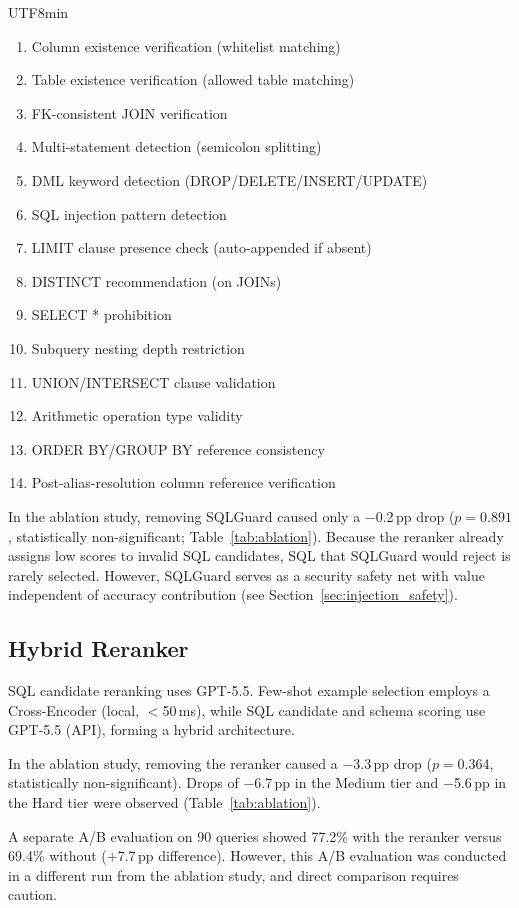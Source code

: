 \documentclass[sn-mathphys,Numbered]{sn-jnl}
\begin{document}
\begin{CJK}{UTF8}{min}
\begin{enumerate}[nosep]
  \item Column existence verification (whitelist matching)
  \item Table existence verification (allowed table matching)
  \item FK-consistent JOIN verification
  \item Multi-statement detection (semicolon splitting)
  \item DML keyword detection (DROP/DELETE/INSERT/UPDATE)
  \item SQL injection pattern detection
  \item LIMIT clause presence check (auto-appended if absent)
  \item DISTINCT recommendation (on JOINs)
  \item SELECT * prohibition
  \item Subquery nesting depth restriction
  \item UNION/INTERSECT clause validation
  \item Arithmetic operation type validity
  \item ORDER BY/GROUP BY reference consistency
  \item Post-alias-resolution column reference verification
\end{enumerate}

In the ablation study, removing SQLGuard caused only a $-$0.2\,pp
drop ($p=0.891$, statistically non-significant;
Table~\ref{tab:ablation}).
Because the reranker already assigns low scores to invalid SQL
candidates, SQL that SQLGuard would reject is rarely selected.
However, SQLGuard serves as a security safety net with value
independent of accuracy contribution
(see Section~\ref{sec:injection_safety}).

\subsection{Hybrid Reranker}

SQL candidate reranking uses GPT-5.5.
Few-shot example selection employs a Cross-Encoder (local, $<$50\,ms),
while SQL candidate and schema scoring use GPT-5.5 (API),
forming a hybrid architecture.

In the ablation study, removing the reranker caused a $-$3.3\,pp
drop ($p=0.364$, statistically non-significant).
Drops of $-$6.7\,pp in the Medium tier and $-$5.6\,pp in the Hard
tier were observed (Table~\ref{tab:ablation}).

A separate A/B evaluation on 90 queries showed 77.2\% with
the reranker versus 69.4\% without ($+$7.7\,pp difference).
However, this A/B evaluation was conducted in a different run from
the ablation study, and direct comparison requires caution.


\end{CJK}
\end{document}
